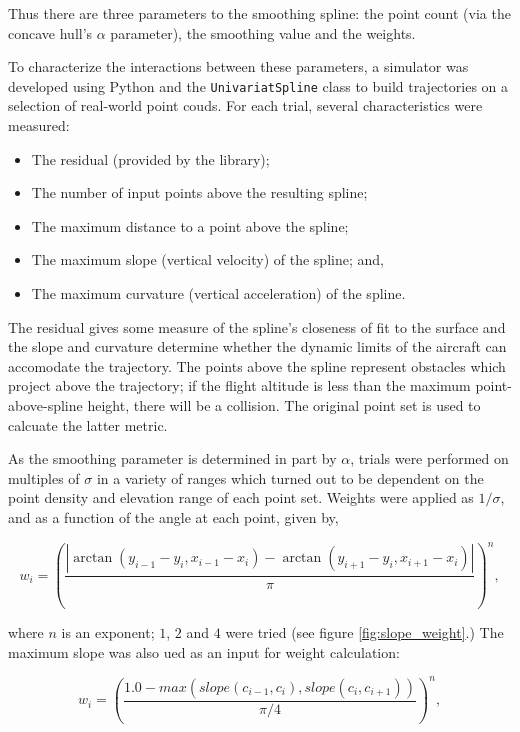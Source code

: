 \documentclass[doc]{apa6}
\begin{document}
Thus there are three parameters to the smoothing spline: the point count (via the concave hull's $\alpha$ parameter), the smoothing value and the weights. 

To characterize the interactions between these parameters, a simulator was developed using Python and the \lstinline{UnivariatSpline}{} class to build trajectories on a selection of real-world point couds. For each trial, several characteristics were measured:

\begin{itemize}
\item The residual (provided by the library);
\item The number of input points above the resulting spline;
\item The maximum distance to a point above the spline;
\item The maximum slope (vertical velocity) of the spline; and,
\item The maximum curvature (vertical acceleration) of the spline.
\end{itemize}

The residual gives some measure of the spline's closeness of fit to the surface and the slope and curvature determine whether the dynamic limits of the aircraft can accomodate the trajectory. The points above the spline represent obstacles which project above the trajectory; if the flight altitude is less than the maximum point-above-spline height, there will be a collision. The original point set is used to calcuate the latter metric.

As the smoothing parameter is determined in part by $\alpha$, trials were performed on multiples of $\sigma$ in a variety of ranges which turned out to be dependent on the point density and elevation range of each point set. Weights were applied as $1/\sigma$, and as a function of the angle at each point, given by,

\begin{equation}
w_i = \left( \frac{ 
			|\arctan(y_{i-1}-y_{i}, x_{i-1}-x_{i}) - \arctan(y_{i+1}-y_{i},x_{i+1}-x_{i})|
		}{
			\pi
		}
	\right)^n,
\end{equation}

where $n$ is an exponent; $1$, $2$ and $4$ were tried (see figure \ref{fig:slope_weight}.) The maximum slope was also ued as an input for weight calculation:

\begin{equation}
w_i = \left(
	\frac{
		1.0 - max(slope(c_{i-1}, c_i), slope(c_i, c_{i+1}))
	}
	{\pi/4}
	\right)^n,
\end{equation}
\end{document}
